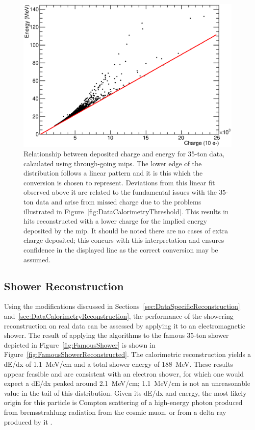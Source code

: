 \begin{figure}
  \centering
  \includegraphics[width=12cm]{ChargeEnergy.eps}
  \caption[Relationship between deposited charge and energy for 35-ton data, calculated using through-going mips.]{Relationship between deposited charge and energy for 35-ton data, calculated using through-going mips.  The lower edge of the distribution follows a linear pattern and it is this which the conversion is chosen to represent.  Deviations from this linear fit observed above it are related to the fundamental issues with the 35-ton data and arise from missed charge due to the problems illustrated in Figure~\ref{fig:DataCalorimetryThreshold}.  This results in hits reconstructed with a lower charge for the implied energy deposited by the mip.  It should be noted there are no cases of extra charge deposited; this concurs with this interpretation and ensures confidence in the displayed line as the correct conversion may be assumed.}
  \label{fig:DataShowerEnergyConversion}
\end{figure}

\subsection{Shower Reconstruction}\label{sec:DataShowerReconstruction}

Using the modifications discussed in Sections~\ref{sec:DataSpecificReconstruction} and~\ref{sec:DataCalorimetryReconstruction}, the performance of the showering reconstruction on real data can be assessed by applying it to an electromagnetic shower.  The result of applying the algorithms to the famous 35-ton shower depicted in Figure~\ref{fig:FamousShower} is shown in Figure~\ref{fig:FamousShowerReconstructed}.  The calorimetric reconstruction yields a dE/dx of 1.1~MeV/cm and a total shower energy of 188~MeV.  These results appear feasible and are consistent with an electron shower, for which one would expect a dE/dx peaked around 2.1~MeV/cm; 1.1~MeV/cm is not an unreasonable value in the tail of this distribution.  Given its dE/dx and energy, the most likely origin for this particle is Compton scattering of a high-energy photon produced from bremsstrahlung radiation from the cosmic muon, or from a delta ray produced by it \cite{MicroBooNECosmics2016}.

